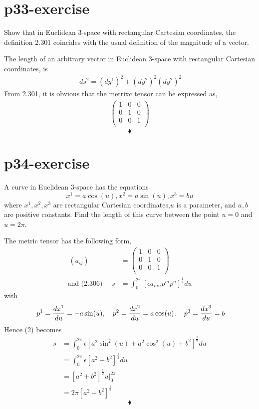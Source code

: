 \section{p33-exercise}
\begin{tcolorbox}
Show that in Euclidean 3-space with rectangular Cartesian coordinates, the definition 2.301 coincides with the usual definition of the magnitude of a vector.
\end{tcolorbox}
The length of an arbitrary vector in Euclidean 3-space with rectangular Cartesian coordinates, is
\begin{align*}
\ ds^2 = (dy^1)^2 + (dy^2)^2 (dy^2)^2
\end {align*}
From 2.301, it is obvious that the metrixc tensor can be expressed as,
\begin{align*}
\begin{pmatrix}1 & 0 &0 \\ 0 & 1 &0\\0 & 0 &1  \\ \end{pmatrix} 
\end{align*}
$$\blacklozenge$$
\newpage


\section{p34-exercise}
\begin{tcolorbox}
A curve in Euclidean 3-space has the equations $$ x^1 =  a \cos(u), x^2 = a\sin(u), x^3 = bu$$ where $x^1, x^2,x^3$ are rectangular Cartesian coordinates,$u$ is a parameter, and $a, b$ are positive constants. Find the length of this curve between the point $u = 0$ and $u = 2\pi$.
\end{tcolorbox}
The metric tensor has the following form,
\begin{align}
\ (a_{ij}) &= \begin{pmatrix}1 & 0 &0 \\ 0 &1 &0\\0 & 0 &1  \\ \end{pmatrix} \\
\text {and  (2.306)  }\quad s &= \int^{2\pi}_0[\epsilon a_{mn}p^mp^n]^{\frac{1}{2}}du
\end{align}
with
\begin{align*}
\ p^1 = \dv{x^1}{u} = -a\sin(u), \quad p^2 = \dv{x^2}{u} = a\cos(u), \quad p^3 = \dv{x^3}{u} = b
\end{align*}
Hence (2) becomes
\begin{align*}
s &= \int^{2\pi}_0\epsilon[a^2 \sin^2(u) + a^2\cos^2(u) + b^2]^{\frac{1}{2}}du\\
\ &= \int^{2\pi}_0\epsilon[a^2+  b^2]^{\frac{1}{2}}du\\
\ &= [a^2+  b^2]^{\frac{1}{2}} \left. u\right|^{2\pi}_0\\
\ &= 2\pi[a^2+  b^2]^{\frac{1}{2}} 
\end{align*}
$$\blacklozenge$$
\newpage

